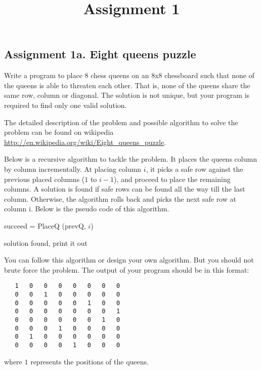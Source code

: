 \documentclass[12pt,a4paper,hidelinks,fleqn]{article}            %
\title{\vspace{-3ex}Assignment 1\vspace{-7ex}}
\date{}
\begin{document}
\maketitle
\subsection*{Assignment 1a. Eight queens puzzle}
Write a program to place 8 chess queens on an 8x8 chessboard 
such that none of the queens is able to threaten each other.
That is, none of the queens share the same row, column or diagonal.
The solution is not unique, but your program is required to find only one valid solution.

The detailed description of the problem and possible algorithm to solve the problem can be found on wikipedia \url{http://en.wikipedia.org/wiki/Eight_queens_puzzle}.

Below is a recursive algorithm to tackle the problem.
It places the queens column by column incrementally. 
At placing column $i$, it picks a safe row against the previous placed columns ($1$ to $i-1$), 
and proceed to place the remaining columns. 
A solution is found if safe rows can be found all the way till the last column.
Otherwise, the algorithm rolls back and picks the next safe row at column i.
Below is the pseudo code of this algorithm.

\begin{algorithm}
	\caption{succeed = PlaceQ (prevQ, $i$)}
	 {
		solution found, print it out
	}
\end{algorithm}

You can follow this algorithm or design your own algorithm.
But you should not brute force the problem.
The output of your program should be in this format:
\begin{verbatim}
   1   0   0   0   0   0   0   0
   0   0   1   0   0   0   0   0
   0   0   0   0   0   1   0   0
   0   0   0   0   0   0   0   1
   0   0   0   0   0   0   1   0
   0   0   0   1   0   0   0   0
   0   1   0   0   0   0   0   0
   0   0   0   0   1   0   0   0
\end{verbatim}
where $1$ represents the positions of the queens.
\end{document}
